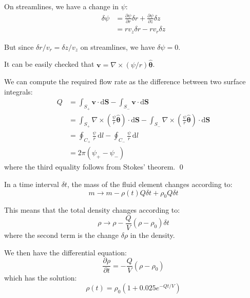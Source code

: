 \documentclass[12pt]{article}
\begin{document}
On streamlines, we have a change in $\psi$:
\begin{equation}
    \begin{split}
        \delta \psi &= \frac{\partial \psi}{\partial r} \delta r + \frac{\partial \psi}{\partial z} \delta z \\
        &= r v_{z} \delta r - r v_{r} \delta z
    \end{split}
\end{equation}

But since $\delta r/v_{r} = \delta z/v_{z}$ on streamlines, we have $\delta \psi = 0$.

It can be easily checked that $\mathbf{v} = \nabla \times (\psi/r) \hat{\mathbf{\theta}}$.

We can compute the required flow rate as the difference between two surface integrals:
\begin{equation}
    \begin{split}
        Q &= \int_{S_{+}} \mathbf{v} \cdot \mathrm{d}\mathbf{S} - \int_{S_{-}} \mathbf{v} \cdot \mathrm{d}\mathbf{S} \\
        &= \int_{S_{+}} \nabla \times \left( \frac{\psi}{r} \hat{\mathbf{\theta}} \right) \cdot \mathrm{d}\mathbf{S} - \int_{S_{-}} \nabla \times \left( \frac{\psi}{r} \hat{\mathbf{\theta}} \right) \cdot \mathrm{d}\mathbf{S} \\
        &= \oint_{C_{+}} \frac{\psi}{r} \, \mathrm{d}l - \oint_{C_{-}} \frac{\psi}{r} \, \mathrm{d}l \\
        &= 2\pi (\psi_{+} - \psi_{-})
    \end{split}
\end{equation}
where the third equality follows from Stokes' theorem.
\qed


In a time interval $\delta t$, the mass of the fluid element changes according to:
\begin{equation}
    m \to m - \rho(t) Q \delta t + \rho_{0} Q \delta t
\end{equation}

This means that the total density changes according to:
\begin{equation}
    \rho \to \rho - \frac{Q}{V} (\rho - \rho_{0}) \delta t
\end{equation}
where the second term is the change $\delta \rho$ in the density.

We then have the differential equation:
\begin{equation}
    \frac{\partial \rho}{\partial t} = -\frac{Q}{V} (\rho - \rho_{0})
\end{equation}
which has the solution:
\begin{equation}
    \rho(t) = \rho_{0} \left( 1 + 0.025 e^{-Qt/V} \right)
\end{equation}
\end{document}

